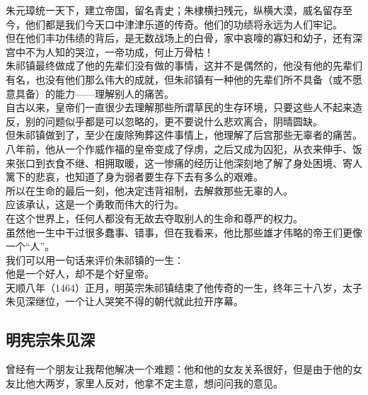 \begin{multicols}{\theparacolNo}
朱元璋统一天下，建立帝国，留名青史；朱棣横扫残元，纵横大漠，威名留存至今，他们都是我们今天口中津津乐道的传奇。他们的功绩将永远为人们牢记。\\

但在他们丰功伟绩的背后，是无数战场上的白骨，家中哀嚎的寡妇和幼子，还有深宫中不为人知的哭泣，一帝功成，何止万骨枯！\\

朱祁镇最终做成了他的先辈们没有做的事情，这并不是偶然的，他没有他的先辈们有名，也没有他们那么伟大的成就，但朱祁镇有一种他的先辈们所不具备（或不愿意具备）的能力——理解别人的痛苦。\\

自古以来，皇帝们一直很少去理解那些所谓草民的生存环境，只要这些人不起来造反，别的问题似乎都是可以忽略的，更不要说什么悲欢离合，阴晴圆缺。\\

但朱祁镇做到了，至少在废除殉葬这件事情上，他理解了后宫那些无辜者的痛苦。八年前，他从一个作威作福的皇帝变成了俘虏，之后又成为囚犯，从衣来伸手、饭来张口到衣食不继、相拥取暖，这一惨痛的经历让他深刻地了解了身处困境、寄人篱下的悲哀，也知道了身为弱者要生存下去有多么的艰难。\\

所以在生命的最后一刻，他决定违背祖制，去解救那些无辜的人。\\

应该承认，这是一个勇敢而伟大的行为。\\

在这个世界上，任何人都没有无故去夺取别人的生命和尊严的权力。\\

虽然他一生中干过很多蠢事、错事，但在我看来，他比那些雄才伟略的帝王们更像一个“人”。\\

我们可以用一句话来评价朱祁镇的一生：\\

他是一个好人，却不是个好皇帝。\\

天顺八年（1464）正月，明英宗朱祁镇结束了他传奇的一生，终年三十八岁，太子朱见深继位，一个让人哭笑不得的朝代就此拉开序幕。\\

\subsection{明宪宗朱见深}
曾经有一个朋友让我帮他解决一个难题：他和他的女友关系很好，但是由于他的女友比他大两岁，家里人反对，他拿不定主意，想问问我的意见。\\


\end{multicols}
